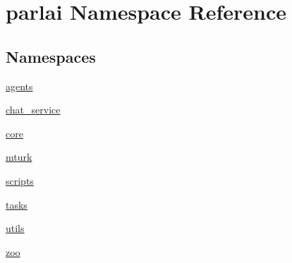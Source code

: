 \hypertarget{namespaceparlai}{}\section{parlai Namespace Reference}
\label{namespaceparlai}
\subsection*{Namespaces}
\begin{DoxyCompactItemize}
\item 
 \hyperlink{namespaceparlai_1_1agents}{agents}
\item 
 \hyperlink{namespaceparlai_1_1chat__service}{chat\+\_\+service}
\item 
 \hyperlink{namespaceparlai_1_1core}{core}
\item 
 \hyperlink{namespaceparlai_1_1mturk}{mturk}
\item 
 \hyperlink{namespaceparlai_1_1scripts}{scripts}
\item 
 \hyperlink{namespaceparlai_1_1tasks}{tasks}
\item 
 \hyperlink{namespaceparlai_1_1utils}{utils}
\item 
 \hyperlink{namespaceparlai_1_1zoo}{zoo}
\end{DoxyCompactItemize}
